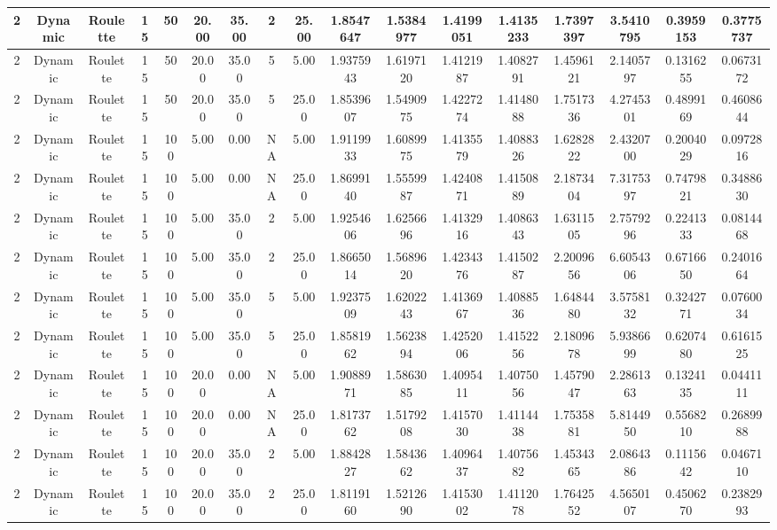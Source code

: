 \documentclass[a4paper]{article}
\begin{document}
\begin{center}
\begin{tabular}{ | c | c | c | c | c | c | c | c | c | c | c | c | c | c | c | c | c | }
		\hline
		2	&	Dynamic	&	Roulette	&	15	&	50	&	20.00	&	35.00	&	2	&	25.00	&	1.8547647	&	1.5384977	&	1.4199051	&	1.4135233	&	1.7397397	&	3.5410795	&	0.3959153	&	0.3775737 \\
		\hline
		2	&	Dynamic	&	Roulette	&	15	&	50	&	20.00	&	35.00	&	5	&	5.00	&	1.9375943	&	1.6197120	&	1.4121987	&	1.4082791	&	1.4596121	&	2.1405797	&	0.1316255	&	0.0673172 \\
		\hline
		2	&	Dynamic	&	Roulette	&	15	&	50	&	20.00	&	35.00	&	5	&	25.00	&	1.8539607	&	1.5490975	&	1.4227274	&	1.4148088	&	1.7517336	&	4.2745301	&	0.4899169	&	0.4608644 \\
		\hline
		2	&	Dynamic	&	Roulette	&	15	&	100	&	5.00	&	0.00	&	NA	&	5.00	&	1.9119933	&	1.6089975	&	1.4135579	&	1.4088326	&	1.6282822	&	2.4320700	&	0.2004029	&	0.0972816 \\
		\hline
		2	&	Dynamic	&	Roulette	&	15	&	100	&	5.00	&	0.00	&	NA	&	25.00	&	1.8699140	&	1.5559987	&	1.4240871	&	1.4150889	&	2.1873404	&	7.3175397	&	0.7479821	&	0.3488630 \\
		\hline
		2	&	Dynamic	&	Roulette	&	15	&	100	&	5.00	&	35.00	&	2	&	5.00	&	1.9254606	&	1.6256696	&	1.4132916	&	1.4086343	&	1.6311505	&	2.7579296	&	0.2241333	&	0.0814468 \\
		\hline
		2	&	Dynamic	&	Roulette	&	15	&	100	&	5.00	&	35.00	&	2	&	25.00	&	1.8665014	&	1.5689620	&	1.4234376	&	1.4150287	&	2.2009656	&	6.6054306	&	0.6716650	&	0.2401664 \\
		\hline
		2	&	Dynamic	&	Roulette	&	15	&	100	&	5.00	&	35.00	&	5	&	5.00	&	1.9237509	&	1.6202243	&	1.4136967	&	1.4088536	&	1.6484480	&	3.5758132	&	0.3242771	&	0.0760034 \\
		\hline
		2	&	Dynamic	&	Roulette	&	15	&	100	&	5.00	&	35.00	&	5	&	25.00	&	1.8581962	&	1.5623894	&	1.4252006	&	1.4152256	&	2.1809678	&	5.9386699	&	0.6207480	&	0.6161525 \\
		\hline
		2	&	Dynamic	&	Roulette	&	15	&	100	&	20.00	&	0.00	&	NA	&	5.00	&	1.9088971	&	1.5863085	&	1.4095411	&	1.4075056	&	1.4579047	&	2.2861363	&	0.1324135	&	0.0441111 \\
		\hline
		2	&	Dynamic	&	Roulette	&	15	&	100	&	20.00	&	0.00	&	NA	&	25.00	&	1.8173762	&	1.5179208	&	1.4157030	&	1.4114438	&	1.7535881	&	5.8144950	&	0.5568210	&	0.2689988 \\
		\hline
		2	&	Dynamic	&	Roulette	&	15	&	100	&	20.00	&	35.00	&	2	&	5.00	&	1.8842827	&	1.5843662	&	1.4096437	&	1.4075682	&	1.4534365	&	2.0864386	&	0.1115642	&	0.0467110 \\
		\hline
		2	&	Dynamic	&	Roulette	&	15	&	100	&	20.00	&	35.00	&	2	&	25.00	&	1.8119160	&	1.5212690	&	1.4153002	&	1.4112078	&	1.7642552	&	4.5650107	&	0.4506270	&	0.2382993 \\

\end{tabular}
\end{center}
\end{document}
